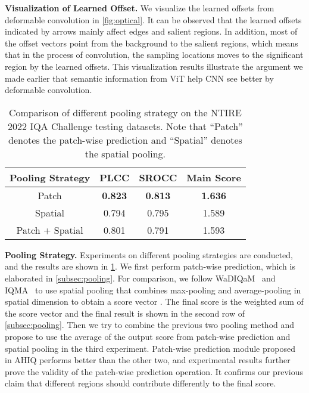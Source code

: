 \documentclass[10pt,twocolumn,letterpaper]{article}
\begin{document}
\vspace{2pt}
\noindent\textbf{Visualization of Learned Offset.} We visualize the learned offsets from deformable convolution in \cref{fig:optical}. It can be observed that the learned offsets indicated by arrows mainly affect edges and salient regions. In addition, most of the offset vectors point from the background to the salient regions, which means that in the process of convolution, the sampling locations moves to the significant region by the learned offsets. This visualization results illustrate the argument we made earlier that semantic information from ViT help CNN see better by deformable convolution.

\begin{table}[ht]
\centering
\caption{Comparison of different pooling strategy on the NTIRE 2022 IQA Challenge testing datasets. Note that ``Patch'' denotes the patch-wise prediction and ``Spatial'' denotes the spatial pooling.}
\begin{tabular}{cccc}
\toprule[1.2pt]
Pooling Strategy & PLCC & SROCC & Main Score \\ \hline
Patch & \textbf{0.823} & \textbf{0.813} & \textbf{1.636} \\
Spatial & 0.794 & 0.795 & 1.589 \\
Patch + Spatial & 0.801 & 0.791 &  1.593\\ \toprule[1.2pt]
\end{tabular}
\label{tab:pooling}
\end{table}


\vspace{2pt}
\noindent\textbf{Pooling Strategy.} Experiments on different pooling strategies are conducted, and the results are shown in \cref{tab:pooling}. We first perform patch-wise prediction, which is elaborated in \cref{subsec:pooling}. For comparison, we follow WaDIQaM~\cite{bosse2017deep} and IQMA~\cite{guo2021iqma} to use spatial pooling that combines max-pooling and average-pooling in spatial dimension to obtain a score vector . The final score is the weighted sum of the score vector and the final result is shown in the second row of \cref{subsec:pooling}. Then we try to combine the previous two pooling method and propose to use the average of the output score from patch-wise prediction and spatial pooling in the third experiment. Patch-wise prediction module proposed in AHIQ performs better than the other two, and experimental results further prove the validity of the patch-wise prediction operation. It confirms our previous claim that different regions should contribute differently to the final score.
\end{document}
